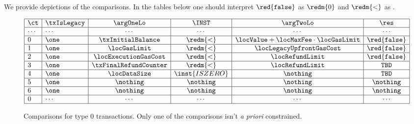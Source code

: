 \def\rFaux{\red{\texttt{false}}}
\def\rZero{\redm{0}}
\def\locLT{\redm{<}}
We provide depictions of the comparisons. In the tables below one should interpret 
$\rFaux$ as $\rZero$ and
$\locLT$ as .
\renewcommand{\arraystretch}{1.3}
\begin{figure}[!h]
	\[
		\begin{array}{|l|l|c|c|c|c|c|c|} \hline
			\ct    & \txIsLegacy & \argOneLo             & \INST         & \argTwoLo                                 & \res         \\ \hline
			\cdots & \cdots      & \cdots                & \cdots        & \cdots                                    & \cdots       \\ \hline
			0      & \one        & \txInitialBalance     & \locLT        & \locValue + \locMaxFee \cdot \locGasLimit & \rFaux       \\ \hline
			1      & \one        & \locGasLimit          & \locLT        & \locLegacyUpfrontGasCost                  & \rFaux       \\ \hline
			2      & \one        & \locExecutionGasCost  & \locLT        & \locRefundLimit                           & \rFaux       \\ \hline
			3      & \one        & \txFinalRefundCounter & \locLT        & \locRefundLimit                           & \texttt{TBD} \\ \hline
			4      & \one        & \locDataSize          & \inst{ISZERO} & \nothing                                  & \texttt{TBD} \\ \hline
			5      & \one        & \nothing              & \nothing      & \nothing                                  & \nothing     \\ \hline
			6      & \one        & \nothing              & \nothing      & \nothing                                  & \nothing     \\ \hline
			0      & \cdots      & \cdots                & \cdots        & \cdots                                    & \cdots       \\ \hline
		\end{array}                                                                                                                 
	\]                                                                                                                          
	\caption{%
		Comparisons for type 0 transactions. \saNote{} Only one of the comparisons isn't \emph{a priori} constrained.}                                                                                                              
\end{figure}                                                                                                                

